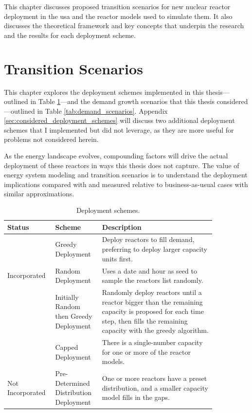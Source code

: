 This chapter discusses proposed transition scenarios for new nuclear reactor deployment in the \gls{usa} and the reactor models used to simulate them. It also discusses the theoretical framework and key concepts that underpin the research and the results for each deployment scheme.

\section{Transition Scenarios}
\label{sec:transition_scenarios}

This chapter explores the deployment schemes implemented in this thesis---outlined in Table \ref{tab:deployment_schemes}---and the demand growth scenarios that this thesis considered---outlined in Table \ref{tab:demand_scenarios}. Appendix \ref{sec:considered_deployment_schemes} will discuss two additional deployment schemes that I implemented but did not leverage, as they are more useful for problems not considered herein.

As the energy landscape evolves, compounding factors will drive the actual deployment of these reactors in ways this thesis does not capture. The value of energy system modeling and transition scenarios is to understand the deployment implications compared with and measured relative to business-as-usual cases with similar approximations.

\begin{table}[H]
    \centering
    \caption{Deployment schemes.}
    \label{tab:deployment_schemes}
    \begin{tabular}{p{0.15\linewidth} >{\raggedright}p{0.20\linewidth}>{\raggedright\arraybackslash}p{0.50\linewidth}}
        \hline
        Status & Scheme & Description \\
        \hline
        & Greedy Deployment & Deploy reactors to fill demand, preferring to deploy larger capacity units first. \\
        Incorporated & Random Deployment & Uses a date and hour as seed to sample the
        reactors list randomly. \\
        & Initially Random then Greedy Deployment & Randomly deploy reactors until
        a reactor bigger than the remaining capacity is proposed for each time step,
        then fills the remaining capacity with the greedy algorithm. \\
        \hline
         & Capped Deployment & There is a
        single-number capacity for one or more of the reactor models. \\
        Not Incorporated & Pre-Determined Distribution Deployment & One or more reactors have a
        preset distribution, and a smaller capacity model fills in the gaps. \\
        \hline
    \end{tabular}
\end{table}

